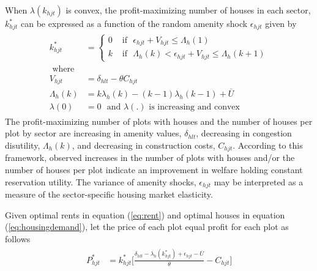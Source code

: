 \documentclass[12pt]{article}
\begin{document}
When $\lambda(k_{hjt})$ is convex, the profit-maximizing number of houses in each sector, $k^{*}_{hjt}$ can be expressed as a function of the random amenity shock $\epsilon_{hjt}$ given by
\begin{align}
\label{eq:housingdemand}
\begin{split}
k_{hjt}^{*} &=
\begin{cases}
0 &\text{ if }\,\, \epsilon_{hjt} + V_{hjt} \leq \Lambda_{h}(1)  \\
k &\text{ if }\,\,  \Lambda_{h}(k) < \epsilon_{hjt} + V_{hjt} \leq \Lambda_{h}(k+1)
\end{cases} \\
\text{ where }& \\
V_{hjt} & = \delta_{hlt}  - \theta C_{hjt}   \\
\Lambda_{h}(k) & =  k\lambda_{h}(k) - (k-1)\lambda_{h}(k-1) + \overline{U} \\
\lambda(0) & = 0 \,\, \text{ and } \lambda(.) \text{ is increasing and convex }
\end{split}
\end{align}
The profit-maximizing number of plots with houses and the number of houses per plot by sector are increasing in amenity values, $\delta_{hlt}$, decreasing in congestion disutility, $\Lambda_{h}(k)$, and decreasing in construction costs, $C_{hjt}$.  According to this framework, observed increases in the number of plots with houses and/or the number of houses per plot indicate an improvement in welfare holding constant reservation utility.  The variance of amenity shocks, $\epsilon_{hjt}$ may be interpreted as a measure of the sector-specific housing market elasticity.  

Given optimal rents in equation (\ref{eq:rent}) and optimal houses in equation (\ref{eq:housingdemand}), let the price of each plot equal profit for each plot as follows
\begin{align}
\label{eq:profits}
\begin{split}
P_{hjt}^{*}  &=
k_{hjt}^{*} \Big[ \frac{ \delta_{hlt} - \lambda_{h}(k_{hjt}^{*}) + \epsilon_{hjt} - \overline{U}}{\theta}  - C_{hjt}\Big] 
\end{split}
\end{align}
\end{document}
